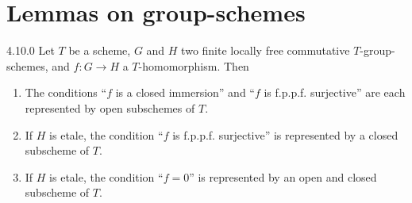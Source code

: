 \section{Lemmas on group-schemes}
\label{sec:4.10}

\begin{plemnum}{4.10.0}\label{lem:4.10.0}
Let $T$ be a scheme, $G$ and $H$ two finite locally free commutative $T$-group-schemes, and $f : G \to H$ a $T$-homomorphism. Then
\begin{enumerate}[(1)]
\item The conditions ``$f$ is a closed immersion'' and ``$f$ is f.p.p.f. surjective'' are each represented by open subschemes of $T$.
\item If $H$ is etale, the condition ``$f$ is f.p.p.f. surjective'' is represented by a closed subscheme of $T$.
\item If $H$ is etale, the condition ``$f = 0$'' is represented by an open and closed subscheme of $T$.
\end{enumerate}
\end{plemnum}

